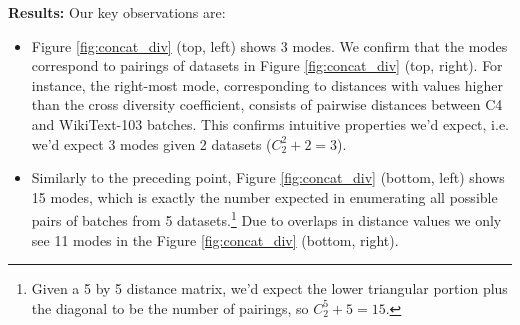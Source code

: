 \documentclass[10pt]{article} %
\begin{document}
\textbf{Results:}
Our key observations are:
\begin{itemize}
    \item Figure \ref{fig:concat_div} (top, left) shows 3 modes. 
    We confirm that the modes correspond to pairings of datasets in Figure \ref{fig:concat_div} (top, right). 
    For instance, the right-most mode, corresponding to distances with values higher than the cross diversity coefficient, consists of pairwise distances between C4 and WikiText-103 batches. 
    This confirms intuitive properties we'd expect, i.e. we'd expect 3 modes given 2 datasets ($C^2_2 + 2 = 3$).
    \item Similarly to the preceding point, Figure \ref{fig:concat_div} (bottom, left) shows 15 modes, which is exactly the number expected in enumerating all possible pairs of batches from 5 datasets.\footnote{Given a 5 by 5 distance matrix, we'd expect the lower triangular portion plus the diagonal to be the number of pairings, so $C^5_2 + 5 = 15$.}
    Due to overlaps in distance values we only see 11 modes in the Figure \ref{fig:concat_div} (bottom, right).

\end{itemize}
\end{document}
